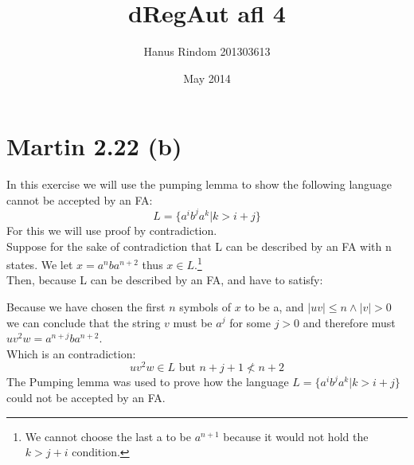 \documentclass{article}
\title{dRegAut afl 4}
\author{Hanus Rindom 201303613}
\date{May 2014}
\begin{document}
\maketitle

\section*{Martin 2.22 (b)}
In this exercise we will use the pumping lemma to show the following language cannot be accepted by an FA:
    $$ L= \{ a^i b^j a^k | k > i + j \} $$
For this we will use proof by contradiction.\\
Suppose for the sake of contradiction that L can be described by an FA with n states. We let $ x = a^n b a^{n+2} $ thus $ x \in L $.\footnote{We cannot choose the last a to be $ a^{n+1} $ because it would not hold the $ k > j+i $ condition.}\\
Then, because L can be described by an FA, and have to satisfy:
    
Because we have chosen the first $ n $ symbols of $ x $ to be a, and $ |uv| \leq n \wedge |v| > 0 $ we can conclude that the string $ v $ must be $ a^j $ for some $ j > 0 $ and therefore must $ u v^2 w = a^{n+j} b a^{n+2} $.\\
Which is an contradiction: 
    $$ u v^2 w \in L \text{ but } n+j+1	\not< n+2 $$
The Pumping lemma was used to prove how the language $ L= \{ a^i b^j a^k | k > i + j \} $ could not be accepted by an FA.
\end{document}
